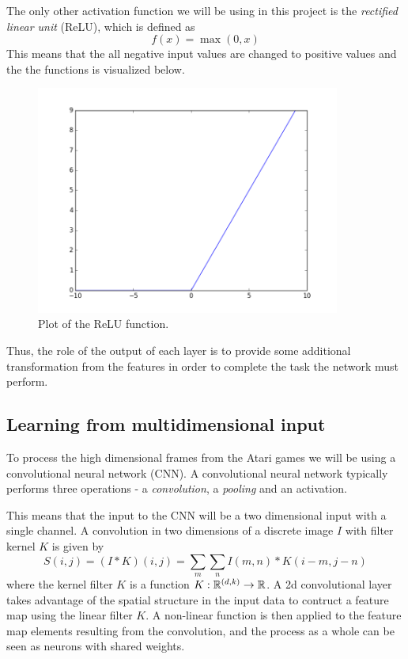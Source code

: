 \documentclass[11pt]{article}
\begin{document}
The only other activation function we will be using in this project
is the \textit{rectified linear unit} (ReLU), which is defined as
\begin{equation}
    f(x) = \max(0,x)
\end{equation}
This means that the all negative input values are changed to positive
values and the the functions is visualized below.

\begin{figure}[!h]
    \centering
    \includegraphics[width=10cm]{include/relu.png}
    \caption{Plot of the ReLU function.}
    \label{fig:relu}
\end{figure}
Thus, the role of the output of each layer is to provide some additional
transformation from the features in order to complete the task the network
must perform\cite{DeepLearningBook}.

\subsection{Learning from multidimensional input}

To process the high dimensional frames from the Atari games we will be using
a convolutional neural network (CNN).
A convolutional neural network typically performs three operations - a \textit{convolution},
a \textit{pooling} and an activation.

This means that the input to the CNN will be a two dimensional input with a single
channel. A convolution in two dimensions of a discrete image $I$ with filter kernel $K$
is given by 
\begin{equation}
    S(i, j) = (I \ast K)(i, j) = \sum\limits_m \sum\limits_n I(m, n) * K(i - m, j - n)
\end{equation}
where the kernel filter $K$ is a function $K : \mathbb{R}^{(d, k)} \to \mathbb{R}$.
A 2d convolutional layer takes advantage of the spatial structure in the input data to contruct a feature map
using the linear filter $K$.
A non-linear function is then applied to the feature map elements resulting from the convolution,
and the process as a whole can be seen as neurons with shared weights\cite{IgelConv}.
\end{document}
